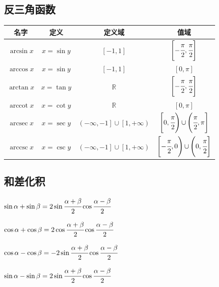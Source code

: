 \documentclass[UTF8,12pt]{ctexbook}
\newcommand{\mediumBigCase}[1]{\left[#1\right]}
\DeclareMathOperator{\arccot}{arccot}
\DeclareMathOperator{\arcsec}{arcsec}
\DeclareMathOperator{\arccsc}{arccsc}
\DeclareMathOperator{\mathRealNumberCollection}{\mathbb{R}}
\DeclareMathOperator{\unionSet}{\cup}
\begin{document}
{{\subsection{反三角函数}{
  \begin{tabular}{|c|c|c|c|}
    \hline
    名字        & 定义         & 定义域                                                     & 值域                                                                      \\
    \hline
    $\arcsin x$ & $x = \sin y$ & $\mediumBigCase{-1,1}$                                     & $\mediumBigCase{-\cfrac{\pi}{2},\cfrac{\pi}{2}}$                          \\
    \hline
    $\arccos x$ & $x = \sin y$ & $\mediumBigCase{-1,1}$                                     & $\mediumBigCase{0,\pi}$                                                   \\
    \hline
    $\arctan x$ & $x = \tan y$ & $\mathRealNumberCollection$                                & $\mediumBigCase{-\cfrac{\pi}{2},\cfrac{\pi}{2}}$                          \\
    \hline
    $\arccot x$ & $x = \cot y$ & $\mathRealNumberCollection$                                & $\mediumBigCase{0,\pi}$                                                   \\
    \hline
    $\arcsec x$ & $x = \sec y$ & $\left(-\infty,-1\right] \unionSet \left[1,+\infty\right)$ & $\left[0,\cfrac{\pi}{2}\right) \unionSet \left(\cfrac{\pi}{2},\pi\right]$ \\
    \hline
    $\arccsc x$ & $x = \csc y$ & $\left(-\infty,-1\right] \unionSet \left[1,+\infty\right)$ & $\left[-\cfrac{\pi}{2},0\right) \unionSet \left(0,\cfrac{\pi}{2}\right]$  \\
    \hline
  \end{tabular}
}%

\subsection{和差化积}{
  $\sin{\alpha}+\sin{\beta} = 2\sin{\cfrac{\alpha + \beta}{2}}\cos{\cfrac{\alpha - \beta}{2}}$

  $\cos{\alpha}+\cos{\beta} = 2\cos{\cfrac{\alpha + \beta}{2}\cos{\cfrac{\alpha-\beta}{2}}}$

  $\cos{\alpha}-\cos{\beta} = -2\sin{\cfrac{\alpha + \beta}{2}}\cos{\cfrac{\alpha - \beta}{2}}$

  $\sin{\alpha}-\sin{\beta} = 2\sin{\cfrac{\alpha + \beta}{2}}\cos{\cfrac{\alpha - \beta}{2}}$

}}}
\end{document}

